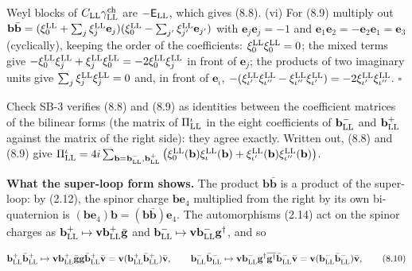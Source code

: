 \documentclass[
  10pt,
]{article}
\begin{document}
Weyl blocks of \(C_{\rm LL}\gamma^{\rm ch}_{\rm LL}\) are
\(-\mathsf E_{\rm LL}\), which gives (8.8). (vi) For (8.9) multiply out
\(\mathbf b\bar{\mathbf b}=(\xi^{\rm LL}_0+\sum_j\xi^{\rm LL}_j\mathbf e_j)(\xi^{\rm LL}_0-\sum_{j'}\xi^{\rm LL}_{j'}\mathbf e_{j'})\)
with \(\mathbf e_j\mathbf e_j=-1\) and
\(\mathbf e_1\mathbf e_2=-\mathbf e_2\mathbf e_1=\mathbf e_3\)
(cyclically), keeping the order of the coefficients:
\(\xi^{\rm LL}_0\xi^{\rm LL}_0=0\); the mixed terms give
\(-\xi^{\rm LL}_0\xi^{\rm LL}_j+\xi^{\rm LL}_j\xi^{\rm LL}_0=-2\xi^{\rm LL}_0\xi^{\rm LL}_j\)
in front of \(\mathbf e_j\); the products of two imaginary units give
\(\sum_j\xi^{\rm LL}_j\xi^{\rm LL}_j=0\) and, in front of
\(\mathbf e_\iota\),
\(-(\xi^{\rm LL}_{\iota'}\xi^{\rm LL}_{\iota''}-\xi^{\rm LL}_{\iota''}\xi^{\rm LL}_{\iota'})=-2\xi^{\rm LL}_{\iota'}\xi^{\rm LL}_{\iota''}\).
\(\square\)

Check SB-3 verifies (8.8) and (8.9) as identities between the
coefficient matrices of the bilinear forms (the matrix of
\(\Pi^\iota_{\rm LL}\) in the eight coefficients of
\(\mathbf b^-_{\rm LL}\) and \(\mathbf b^+_{\rm LL}\) against the matrix
of the right side): they agree exactly. Written out, (8.8) and (8.9)
give
\(\Pi^\iota_{\rm LL}=4i\sum_{\mathbf b=\mathbf b^-_{\rm LL},\mathbf b^+_{\rm LL}}\big(\xi^{\rm LL}_0(\mathbf b)\xi^{\rm LL}_\iota(\mathbf b)+\xi^{\rm LL}_{\iota'}(\mathbf b)\xi^{\rm LL}_{\iota''}(\mathbf b)\big)\).

\textbf{What the super-loop form shows.} The product
\(\mathbf b\bar{\mathbf b}\) is a product of the super-loop: by (2.12),
the spinor charge \(\mathbf b\mathbf e_4\) multiplied from the right by
its own bi-quaternion is
\((\mathbf b\mathbf e_4)\mathbf b=(\mathbf b\bar{\mathbf b})\mathbf e_4\).
The automorphisms (2.14) act on the spinor charges as
\(\mathbf b^+_{\rm LL}\mapsto\mathbf v\mathbf b^+_{\rm LL}\bar{\mathbf g}\)
and
\(\mathbf b^-_{\rm LL}\mapsto\mathbf v\mathbf b^-_{\rm LL}\mathbf g^\dagger\),
and so

\[\mathbf b^+_{\rm LL}\bar{\mathbf b}^+_{\rm LL}\mapsto\mathbf v\mathbf b^+_{\rm LL}\bar{\mathbf g}\mathbf g\bar{\mathbf b}^+_{\rm LL}\bar{\mathbf v}=\mathbf v(\mathbf b^+_{\rm LL}\bar{\mathbf b}^+_{\rm LL})\bar{\mathbf v},\qquad\mathbf b^-_{\rm LL}\bar{\mathbf b}^-_{\rm LL}\mapsto\mathbf v\mathbf b^-_{\rm LL}\mathbf g^\dagger\overline{\mathbf g^\dagger}\bar{\mathbf b}^-_{\rm LL}\bar{\mathbf v}=\mathbf v(\mathbf b^-_{\rm LL}\bar{\mathbf b}^-_{\rm LL})\bar{\mathbf v},\tag{8.10}\]
\end{document}

